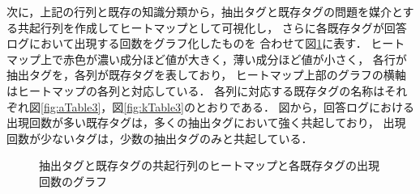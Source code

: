 次に，上記の行列と既存の知識分類から，抽出タグと既存タグの問題を媒介とする共起行列を作成してヒートマップとして可視化し，
さらに各既存タグが回答ログにおいて出現する回数をグラフ化したものを
合わせて図\ref{fig:Heatmap}に表す．
ヒートマップ上で赤色が濃い成分ほど値が大きく，薄い成分ほど値が小さく，
各行が抽出タグを，各列が既存タグを表しており，
ヒートマップ上部のグラフの横軸はヒートマップの各列と対応している．
各列に対応する既存タグの名称はそれぞれ図\ref{fig:aTable3}，図\ref{fig:kTable3}のとおりである．
図から，回答ログにおける出現回数が多い既存タグは，多くの抽出タグにおいて強く共起しており，
出現回数が少ないタグは，少数の抽出タグのみと共起している．

\begin{figure}[H]
\begin{center}
\hspace*{-20pt}
\end{center}
\caption{抽出タグと既存タグの共起行列のヒートマップと各既存タグの出現回数のグラフ}
\label{fig:Heatmap}
\end{figure}



